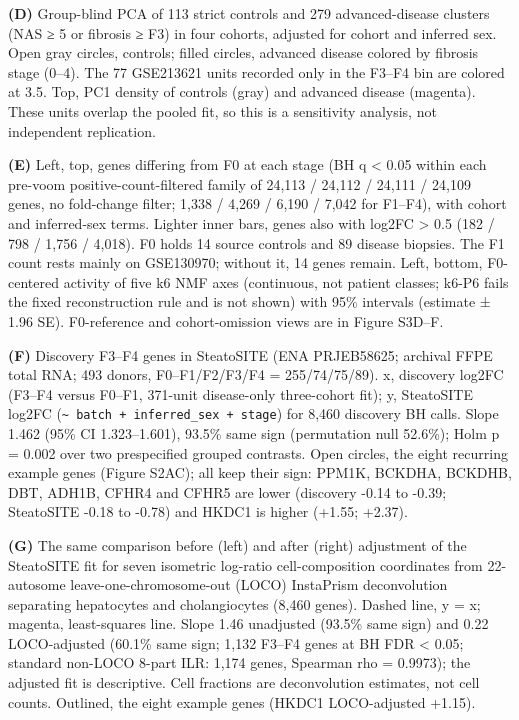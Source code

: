 \textbf{(D)} Group-blind PCA of 113 strict controls and 279 advanced-disease clusters (NAS ≥ 5 or fibrosis ≥ F3) in four cohorts, adjusted for cohort and inferred sex. Open gray circles, controls; filled circles, advanced disease colored by fibrosis stage (0--4). The 77 GSE213621 units recorded only in the F3--F4 bin are colored at 3.5. Top, PC1 density of controls (gray) and advanced disease (magenta). These units overlap the pooled fit, so this is a sensitivity analysis, not independent replication.

\textbf{(E)} Left, top, genes differing from F0 at each stage (BH q \textless{} 0.05 within each pre-voom positive-count-filtered family of 24,113 / 24,112 / 24,111 / 24,109 genes, no fold-change filter; 1,338 / 4,269 / 6,190 / 7,042 for F1--F4), with cohort and inferred-sex terms. Lighter inner bars, genes also with \textbar log2FC\textbar{} \textgreater{} 0.5 (182 / 798 / 1,756 / 4,018). F0 holds 14 source controls and 89 disease biopsies. The F1 count rests mainly on GSE130970; without it, 14 genes remain. Left, bottom, F0-centered activity of five k6 NMF axes (continuous, not patient classes; k6-P6 fails the fixed reconstruction rule and is not shown) with 95\% intervals (estimate ± 1.96 SE). F0-reference and cohort-omission views are in Figure S3D--F.

\textbf{(F)} Discovery F3--F4 genes in SteatoSITE (ENA PRJEB58625; archival FFPE total RNA; 493 donors, F0--F1/F2/F3/F4 = 255/74/75/89). x, discovery log2FC (F3--F4 versus F0--F1, 371-unit disease-only three-cohort fit); y, SteatoSITE log2FC (\texttt{\textasciitilde{}\ batch\ +\ inferred\_\allowbreak{}sex\ +\ stage}) for 8,460 discovery BH calls. Slope 1.462 (95\% CI 1.323--1.601), 93.5\% same sign (permutation null 52.6\%); Holm p = 0.002 over two prespecified grouped contrasts. Open circles, the eight recurring example genes (Figure S2AC); all keep their sign: PPM1K, BCKDHA, BCKDHB, DBT, ADH1B, CFHR4 and CFHR5 are lower (discovery -0.14 to -0.39; SteatoSITE -0.18 to -0.78) and HKDC1 is higher (+1.55; +2.37).

\textbf{(G)} The same comparison before (left) and after (right) adjustment of the SteatoSITE fit for seven isometric log-ratio cell-composition coordinates from 22-autosome leave-one-chromosome-out (LOCO) InstaPrism deconvolution separating hepatocytes and cholangiocytes (8,460 genes). Dashed line, y = x; magenta, least-squares line. Slope 1.46 unadjusted (93.5\% same sign) and 0.22 LOCO-adjusted (60.1\% same sign; 1,132 F3--F4 genes at BH FDR \textless{} 0.05; standard non-LOCO 8-part ILR: 1,174 genes, Spearman rho = 0.9973); the adjusted fit is descriptive. Cell fractions are deconvolution estimates, not cell counts. Outlined, the eight example genes (HKDC1 LOCO-adjusted +1.15).


